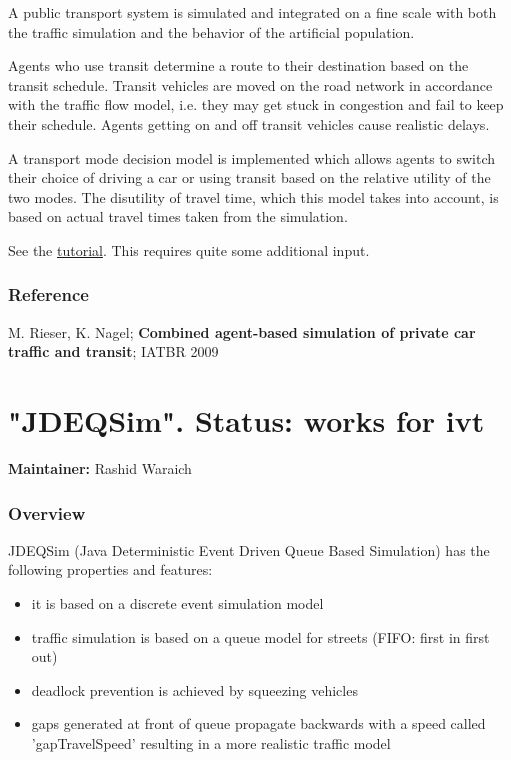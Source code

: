 A  public transport system is simulated and integrated on a fine scale  with both the traffic simulation and the behavior of the artificial  population.

Agents who use transit determine a route to their destination based  on the transit schedule. Transit vehicles are moved on the road network  in accordance with the traffic flow model, i.e. they may get stuck in  congestion and fail to keep their schedule. Agents getting on and off  transit vehicles cause realistic delays.

A transport mode decision model is implemented which allows agents to  switch their choice of driving a car or using transit based on the  relative utility of the two modes. The disutility of travel time, which  this model takes into account, is based on actual travel times taken  from the simulation.

See the \href{http://matsim.org/docs/tutorials/transit}{tutorial}. This requires quite some additional input.

\subsubsection{Reference}

M. Rieser, K. Nagel; \textbf{Combined agent-based simulation of private car traffic and transit}; IATBR 2009

\vfill\eject
\section{"JDEQSim".  Status: works for ivt}

\textbf{Maintainer:} Rashid Waraich

\subsubsection{Overview}

JDEQSim (Java Deterministic Event Driven Queue Based Simulation) has the following properties and features:
\begin{itemize}
	\item it is based on a discrete event simulation model
	\item traffic simulation is based on a queue model for streets (FIFO: first in first out)
	\item deadlock prevention is achieved by squeezing vehicles
	\item gaps  generated at front of queue propagate backwards with a speed called  'gapTravelSpeed' resulting in a more realistic traffic model
\end{itemize}

